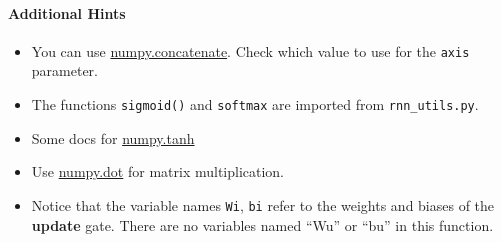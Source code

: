 \documentclass[11pt]{article}
\providecommand{\tightlist}{%
      \setlength{\itemsep}{0pt}\setlength{\parskip}{0pt}}
\begin{document}
    \hypertarget{additional-hints}{%
\paragraph{Additional Hints}\label{additional-hints}}

\begin{itemize}
\tightlist
\item
  You can use
  \href{https://docs.scipy.org/doc/numpy/reference/generated/numpy.concatenate.html}{numpy.concatenate}.
  Check which value to use for the \texttt{axis} parameter.
\item
  The functions \texttt{sigmoid()} and \texttt{softmax} are imported
  from \texttt{rnn\_utils.py}.
\item
  Some docs for
  \href{https://docs.scipy.org/doc/numpy/reference/generated/numpy.tanh.html}{numpy.tanh}
\item
  Use
  \href{https://docs.scipy.org/doc/numpy/reference/generated/numpy.dot.html}{numpy.dot}
  for matrix multiplication.
\item
  Notice that the variable names \texttt{Wi}, \texttt{bi} refer to the
  weights and biases of the \textbf{update} gate. There are no variables
  named ``Wu'' or ``bu'' in this function.
\end{itemize}
\end{document}
